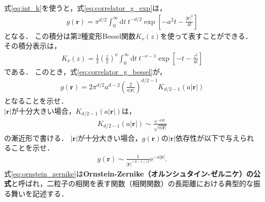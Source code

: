 \documentclass[a4paper,12pt]{jsarticle}
\begin{document}
式\eqref{eq:int_k}を使うと，式\eqref{eq:correlator_g_exp}は，
\begin{align}
\label{eq:correlator_g_bessel}
    g(\bm{r})
    =
    \pi^{d/2}
    \int^{\infty}_{0}\mathrm{d}t
    ~t^{-d/2}
    \exp\left[
        -a^{2}t-\frac{|\bm{r}|^{2}}{4t}
    \right]
\end{align}
となる．
この積分は第2種変形Bessel関数$K_{\nu}(z)$を使って表すことができる．
その積分表示は，
\begin{align}
    K_{\nu}(z)
    =
    \frac{1}{2}\left(\frac{z}{2}\right)^{\nu}
    \int^{\infty}_{0}\mathrm{d}t
    ~t^{-\nu-1}
    \exp\left[
        -t-\frac{z^{2}}{4t}
    \right]
\end{align}
である．
このとき，式\eqref{eq:correlator_g_bessel}が，
\begin{align}
    g(\bm{r})
    =
    2\pi^{d/2}a^{d-2}\left(\frac{2}{a|\bm{r}|}\right)^{d/2-1}
    K_{d/2-1}(a|\bm{r}|)
\end{align}
となることを示せ．
\\

$|\bm{r}|$が十分大きい場合，$K_{d/2-1}(a|\bm{r}|)$は，
\begin{align}
    K_{d/2-1}(a|\bm{r}|)
    \sim
    \frac{\mathrm{e}^{-a|\bm{r}|}}{\sqrt{a|\bm{r}|}}
\end{align}
の漸近形で書ける．
$|\bm{r}|$が十分大きい場合，$g(\bm{r})$の$|\bm{r}|$依存性が以下で与えられることを示せ．
\begin{align}
\label{eq:ornstein_zernike}
    g(\bm{r})
    \sim
    \frac{1}{|\bm{r}|^{(d-1)/2}}
    \mathrm{e}^{-a|\bm{r}|}.
\end{align}
式\eqref{eq:ornstein_zernike}は{\bf Ornstein-Zernike（オルンシュタイン-ゼルニケ）の公式}と呼ばれ，二粒子の相関を表す関数（相関関数）の長距離における典型的な振る舞いを記述する．



%
%
\end{document}

